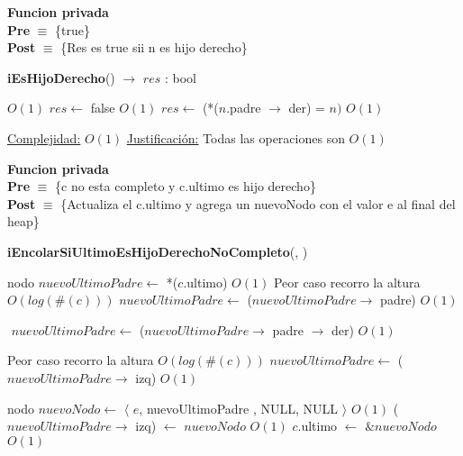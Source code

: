 \begin{Algoritmos}
$ $\newline

\textbf{Funcion privada}\\
\textbf{Pre} $\equiv$ \{true\}\\%
\textbf{Post} $\equiv$ \{Res es true sii n es hijo derecho\}%
\begin{algorithm}[H]
{\textbf{iEsHijoDerecho}() $\to$ $res$ : bool}
\begin{algorithmic}[1]
    
     \Comment $O(1)$
        \State $res \gets$ false \Comment $O(1)$
    \Else
        \State $res \gets $ (*($n$.padre $\to$ der) = $n)$ \Comment $O(1)$
    \EndIf

    \medskip
    \Statex \underline{Complejidad:} $O(1)$
    \Statex \underline{Justificaci\'on:} Todas las operaciones son $O(1)$
\end{algorithmic}
\end{algorithm}



\textbf{Funcion privada}\\
\textbf{Pre} $\equiv$ \{c no esta completo y c.ultimo es hijo derecho\}\\%
\textbf{Post} $\equiv$ \{Actualiza el c.ultimo y agrega un nuevoNodo con el valor e al final del heap\}%
\begin{algorithm}[H]
{\textbf{iEncolarSiUltimoEsHijoDerechoNoCompleto}(, )}
\begin{algorithmic}[1]

    \State nodo $nuevoUltimoPadre  \gets$ *($c$.ultimo) \Comment $O(1)$
      \Comment Peor caso recorro la altura $O(log(\#(c)))$
        \State $nuevoUltimoPadre  \gets$ ($nuevoUltimoPadre  \to$ padre) \Comment $O(1)$
    \EndWhile
    
    \State $ $
    \State $nuevoUltimoPadre  \gets$ ($nuevoUltimoPadre  \to$ padre $\to$ der) \Comment $O(1)$
    \State $ $
    
     \Comment Peor caso recorro la altura $O(log(\#(c)))$
        \State $nuevoUltimoPadre  \gets$ ($nuevoUltimoPadre  \to$ izq) \Comment $O(1)$
    \EndWhile
    \State $ $

    \State nodo $nuevoNodo \gets$ $\langle$ $e$, nuevoUltimoPadre , NULL, NULL $\rangle$ \Comment $O(1)$
    \State ($nuevoUltimoPadre  \to$ izq) $\gets$ $nuevoNodo$ \Comment $O(1)$
    \State $c$.ultimo $\gets$ $\&nuevoNodo$ \Comment $O(1)$


\end{algorithmic}
\end{algorithm}
\end{Algoritmos}
